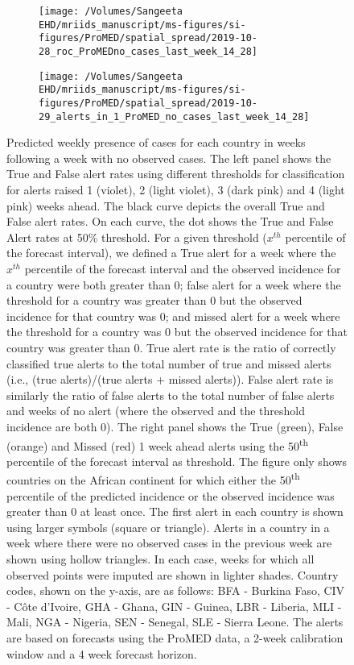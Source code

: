 \documentclass[9pt,twoside,lineno]{pnas-new}
\begin{document}
\begin{figure}
\centering
\begin{subfigure}[b]{0.45\textwidth}
\texttt{[image: /Volumes/Sangeeta EHD/mriids\_manuscript/ms-figures/si-figures/ProMED/spatial\_spread/2019-10-28\_roc\_ProMEDno\_cases\_last\_week\_14\_28]}
\end{subfigure}
\begin{subfigure}[b]{0.45\textwidth}
\texttt{[image: /Volumes/Sangeeta
  EHD/mriids\_manuscript/ms-figures/si-figures/ProMED/spatial\_spread/2019-10-29\_alerts\_in\_1\_ProMED\_no\_cases\_last\_week\_14\_28]}
\end{subfigure}
\caption{Predicted weekly presence of cases for each 
country in weeks following a week with no observed cases. 
The left panel shows the True and False alert rates using
different thresholds for classification for alerts raised 1 (violet), 2
(light violet), 3 (dark pink) and 4 (light pink) weeks ahead. The
black curve depicts the overall True and False alert rates. On each
curve, the dot shows the True and False Alert rates at 50\% threshold.
For a given threshold (\(x^{th}\)
percentile of the forecast interval), we defined a True alert for a week
where the \(x^{th}\) percentile of the forecast interval and the
observed incidence for a country were both greater than 0; false alert
for a week where the threshold for a country was greater than 0 but the
observed incidence for that country was 0; and missed alert for a week where
the threshold for a country was 0 but the observed incidence for that
country was greater than 0. True alert rate is the ratio of correctly
classified true alerts to the total number of true and missed alerts
(i.e., (true alerts)/(true alerts + missed alerts)). False alert rate is
similarly the ratio of false alerts to the total number of false alerts
and weeks of no alert (where the observed and the threshold incidence
are both 0). The right panel shows the True (green), False (orange) and
Missed (red) 1 week ahead alerts using the 50\textsuperscript{th} percentile of the
forecast interval as threshold. 
The figure only shows countries on the
African continent for which either the 50\textsuperscript{th}
percentile of the predicted incidence or the
observed incidence was greater than 0 at least once. 
The first alert in each country is shown
using larger symbols (square or triangle). Alerts in a country in a
week where there were no observed cases in the previous week are shown
using hollow triangles. In each case, weeks for which all observed points
were imputed are shown in lighter shades.
Country codes, shown on the y-axis, are as
follows: BFA - Burkina Faso, CIV - Côte d'Ivoire,
GHA - Ghana, GIN - Guinea, LBR - Liberia, MLI - Mali, NGA - Nigeria,
SEN - Senegal, SLE - Sierra Leone. The alerts are based on forecasts 
using the ProMED data, a 2-week calibration window and a 4 week
forecast horizon.}
\label{fig:rocnocases}
\end{figure}\FloatBarrier
\end{document}

